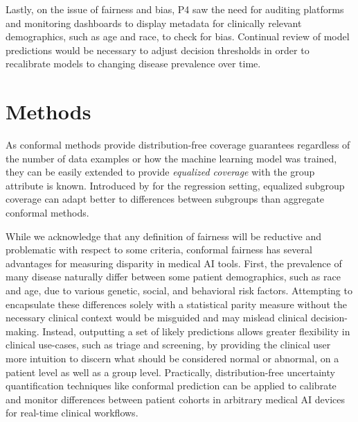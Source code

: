 \documentclass[letterpaper]{article} %
\begin{document}
    Lastly, on the issue of fairness and bias, P4 saw the need for auditing platforms and monitoring dashboards to display metadata for clinically relevant demographics, such as age and race, to check for bias.
    Continual review of model predictions would be necessary to adjust decision thresholds in order to recalibrate models to changing disease prevalence over time.
    
\section{Methods}
    As conformal methods provide distribution-free coverage guarantees regardless of the number of data examples or how the machine learning model was trained, they can be easily extended to provide \textit{equalized coverage} with the group attribute is known.
    Introduced by \citet{Romano2020With} for the regression setting, equalized subgroup coverage can adapt better to differences between subgroups than aggregate conformal methods.
    
    While we acknowledge that any definition of fairness will be reductive and problematic with respect to some criteria, conformal fairness has several advantages for measuring disparity in medical AI tools. 
    First, the prevalence of many disease naturally differ between some patient demographics, such as race and age, due to various genetic, social, and behavioral risk factors.
    Attempting to encapsulate these differences solely with a statistical parity measure without the necessary clinical context would be misguided and may mislead clinical decision-making.
    Instead, outputting a set of likely predictions allows greater flexibility in clinical use-cases, such as triage and screening, by providing the clinical user more intuition to discern what should be considered normal or abnormal, on a patient level as well as a group level.
    Practically, distribution-free uncertainty quantification techniques like conformal prediction can be applied to calibrate and monitor differences between patient cohorts in arbitrary medical AI devices for real-time clinical workflows.
\end{document}
